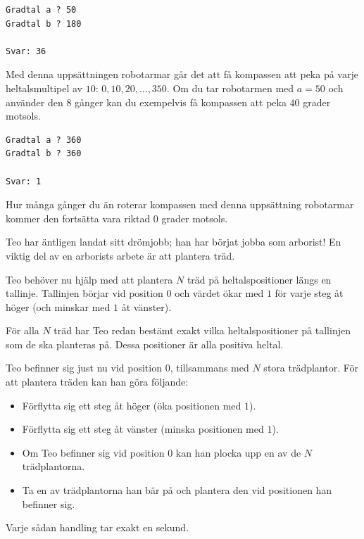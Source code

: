 \vspace{0.3cm}

\begin{verbatim}
Gradtal a ? 50
Gradtal b ? 180

Svar: 36
\end{verbatim}
 Med denna uppsättningen robotarmar går det att få kompassen
att peka på varje heltalsmultipel av $10$: $0, 10, 20, \dots, 350$.
Om du tar robotarmen med $a=50$ och använder den $8$ gånger kan du exempelvis få kompassen att peka $40$ grader motsols.

\vspace{0.4cm}

\begin{verbatim}
Gradtal a ? 360
Gradtal b ? 360

Svar: 1
\end{verbatim}
 Hur många gånger du än roterar kompassen med denna uppsättning robotarmar kommer den fortsätta vara riktad $0$ grader motsols.


\newpage
{}

Teo har äntligen landat sitt drömjobb; han har börjat jobba som arborist!
En viktig del av en arborists arbete är att plantera träd.

Teo behöver nu hjälp med att plantera $N$ träd på heltalspositioner längs en tallinje. 
Tallinjen börjar vid position $0$ och värdet ökar med $1$ för varje steg åt höger (och minskar med $1$ åt vänster).

För alla $N$ träd har Teo redan bestämt exakt vilka heltalspositioner på tallinjen som de ska planteras på. 
Dessa positioner är alla positiva heltal.

Teo befinner sig just nu vid position $0$, tillsammans med $N$ stora trädplantor.
För att plantera träden kan han göra följande:
\begin{itemize}
  \item Förflytta sig ett steg åt höger (öka positionen med $1$).
  \item Förflytta sig ett steg åt vänster (minska positionen med $1$).
  \item Om Teo befinner sig vid position $0$ kan han plocka upp en av de $N$ trädplantorna.
  \item Ta en av trädplantorna han bär på och plantera den vid positionen han befinner sig.
\end{itemize}
Varje sådan handling tar exakt en sekund.

